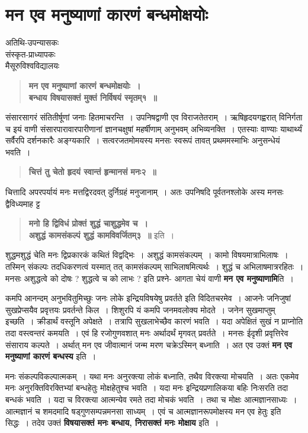 {\fontsize{15}{17}\selectfont
\chapter{मन एव मनुष्याणां कारणं बन्धमोक्षयोः }

\begin{center}
\smallskip
अतिथि-उपन्यासकः\\
संस्कृत-प्राध्यापकः\\
मैसूरुविश्वविद्यालयः
\addrule
\end{center}
\begin{verse}
\textbf{मन एव मनुष्याणां कारणं बन्धमोक्षयोः~। \\
बन्धाय विषयासक्तं मुक्तं निर्विषयं स्मृतम्१~॥}
\end{verse}
संसारसागरं संतितीर्षूणां जनाः हितमाचरन्ति~। उपनिषद्वाणी एव विराजतेतराम्~। ऋषिहृदयगह्वरात् विनिर्गता च इयं वाणी संसारपारावारपारीणानां ज्ञानचक्षुषां महर्षीणाम् अनुभवम् अभिव्यनक्ति~। एतस्याः वाण्याः याथार्थ्यं सर्वैरपि दर्शनकारैः अङ्ग्यकारि~। सत्वरजतमोमयस्य मनसः स्वरूपं तावत् प्रथममस्माभिः अनुसन्धेयं भवति~। 
\begin{verse}
\textbf{चित्तं तु चेतो हृदयं स्वान्तं हृन्मानसं मनः२~॥}
\end{verse}
चित्तादि अपरपर्यायं मनः मत्तद्विरदवत् दुर्निग्रहं मनुजानाम्~। अतः उपनिषदि पूर्वतनश्लोके अस्य मनसः द्वैविध्यमाह ट्ट 
\begin{verse}
\textbf{मनो हि द्विविधं प्रोक्तं शुद्धं चाशुद्धमेव च~। \\
अशुद्धं कामसंकल्पं शुद्धं कामविवर्जितम्३~॥} इति~। 
\end{verse}
शुद्धमशुद्धं चेति मनः द्विप्रकारकं कथितं विद्वद्भिः~। अशुद्धं कामसंकल्पम्~। कामो विषयमात्राभिलाषः~। तस्मिन् संकल्पः तदधिकरणत्वं यस्मात् तत् कामसंकल्पम् साभिलाषमित्यर्थः~। शुद्धं च अभिलाषमात्ररहितः~। मनसः अशुद्धत्वे को दोषः ? शुद्धत्वे च को लाभः ? इति प्रश्ने- आगता चेयं वाणी \textbf{मन एव मनुष्याणामि}ति~।   

कमपि आनन्दम् अनुभवितुमिच्छुः जनः लोके इन्द्रियविषयेषु प्रवर्तते इति विदितचरमेव~। आजनेः जनिजुषां सुखप्रेप्सयैव प्रवृत्तयः प्रवर्तन्ते किल~। शिशुरपि यं कमपि जनमवलोक्य मोदते~। जनेन सुखमाप्तुम् इच्छति~। क्रीडार्थं वस्तूनि अपेक्षते~। तत्रापि सुखलाभेच्छैव कारणं भवति~। यदा अपेक्षितं सुखं न प्राप्नोति तदा वस्त्वन्तरं कमयति~। एवं हि रजोगुणवशात् मनः अर्थादर्थं मृगवत् प्रवर्तते~। मनसः ईदृशी प्रवृत्तिरेव संसाराय कल्पते~। अर्थात् मन एव जीवात्मानं जन्म मरण चक्रेऽस्मिन् बध्नाति~। अत एव उक्तं \textbf{मन एव मनुष्याणां कारणं बन्धस्य} इति~। 

मनः संकल्पविकल्पात्मकम्~। यथा मनः अनुरक्त्या लोकं बध्नाति, तथैव विरक्त्या मोचयति~। अतः एकमेव मनः अनुरक्तिविरक्तिभ्यां बन्धहेतुः मोक्षहेतुश्च भवति~। यदा मनः इन्द्रियप्रणालिकया बहिः निःसरति तदा बन्धकं भवति~। यदा च विरक्त्या आत्मन्येव रमते तदा मोचकं भवति~। तथा च मोक्षः आत्मज्ञानसाध्यः~। आत्मज्ञानं च शमदमादि षड्गुणसम्पन्नमनसा साध्यम्~। एवं च आत्मज्ञानरूपमोक्षस्य मन एव हेतुः इति सिद्धः~। तदेव उक्तं \textbf{विषयासक्तं मनः बन्धाय, निरासक्तं मनः मोक्षाय} इति~। 

}
